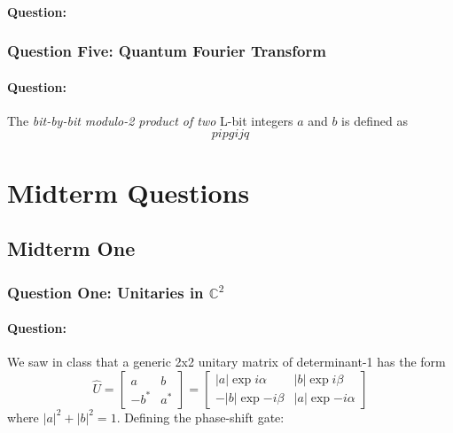 \documentclass[reprint, amsmath,amssymb, aps]{revtex4-2}
\begin{document}
                \paragraph{Question:}

            \subsubsection{Question Five: Quantum Fourier Transform}
                \paragraph{Question:}
                The \textit{bit-by-bit modulo-2 product of two} L-bit integers $a$ and $b$ is defined as
                \begin{equation*}
                    pipgijq
                \end{equation*}
                
    \section{Midterm Questions}
        \subsection{Midterm One} \label{sec:midterm1}
            \subsubsection{Question One: Unitaries in $\mathbb{C}^2$}
                \paragraph{Question:}
                We saw in class that a generic 2x2 unitary matrix of determinant-1 has the form
                \begin{equation*}
                    \hat{U} = \begin{bmatrix} a & b\\-b^*&a^*\end{bmatrix} = \begin{bmatrix}
                        |a|\exp{i\alpha} & |b|\exp{i\beta} \\
                        -|b|\exp{-i\beta} & |a|\exp{-i\alpha}
                    \end{bmatrix}
                \end{equation*}
                where $|a|^2 + |b|^2 = 1$. Defining the phase-shift gate:
\end{document}
